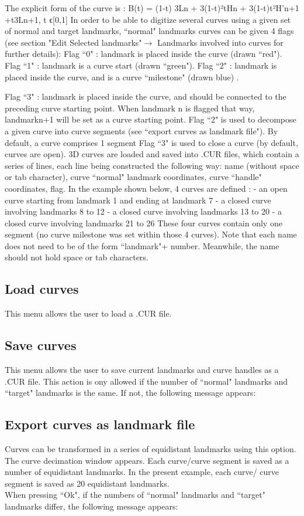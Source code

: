 The explicit form of the curve is :
B(t) = (1-t) 3Ln + 3(1-t)²tHn + 3(1-t)t²H’n+1 +t3Ln+1, t ϵ[0,1]
In order to be able to digitize several curves using a given set of normal and target landmarks,
``normal" landmarks curves can be given 4 flags (see section "Edit Selected landmarks"$\rightarrow$ Landmarks
involved into curves for further details):
Flag ``0" : landmark is placed inside the curve (drawn ``red").
Flag ``1" : landmark is a curve start (drawn ``green").
Flag ``2" : landmark is placed inside the curve, and is a curve ``milestone" (drawn blue) .

Flag ``3" : landmark is placed inside the curve, and should be connected to the preceding curve
starting point. When landmark n is flagged that way, landmarkn+1 will be set as a curve starting point.
Flag ``2" is used to decompose a given curve into curve segments (see ``export curves as landmark
file"). By default, a curve comprises 1 segment
Flag ``3" is used to close a curve (by default, curves are open).
3D curves are loaded and saved into .CUR files, which contain a series of lines, each line being
constructed the following way: name (without space or tab character), curve ``normal" landmark
coordinates, curve ``handle" coordinates, flag.
In the example shown below, 4 curves are defined :
- an open curve starting from landmark 1 and ending at landmark 7
- a closed curve involving landmarks 8 to 12
- a closed curve involving landmarks 13 to 20
- a closed curve involving landmarks 21 to 26
These four curves contain only one segment (no curve milestone was set within those 4 curves).
Note that each name does not need to be of the form ``landmark"+ number. Meanwhile, the name
should not hold space or tab characters.


\subsection{Load curves}
This menu allows the user to load a .CUR file.
\subsection{Save curves}
This menu allows the user to save current landmarks and curve handles as a .CUR file. This action
is ony allowed if the number of ``normal" landmarks and ``target" landmarks is the same. If not, the
following message appears:

\subsection{Export curves as landmark file}
Curves can be transformed in a series of equidistant
landmarks using this option. The curve decimation window
appears.
Each curve/curve segment is saved as a number of
equidistant landmarks. In the present example, each curve/
curve segment is saved as 20 equidistant landmarks.\\
When pressing ``Ok", if the numbers of ``normal" landmarks and ``target" landmarks differ, the
following message appears:
